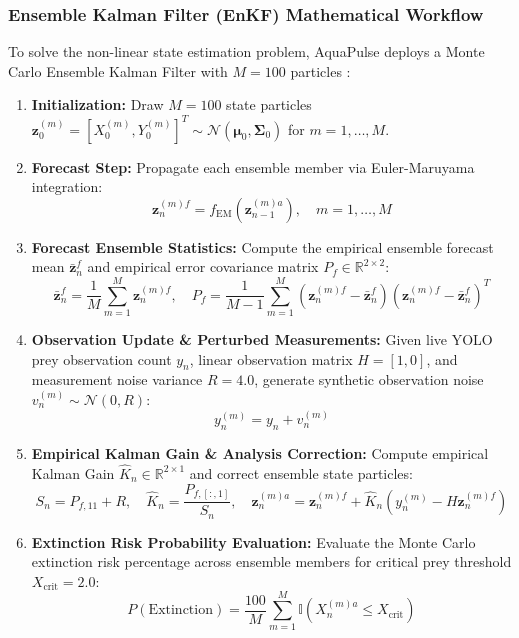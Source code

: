 \documentclass[11pt,a4paper]{article}
\newcommand{\citeblue}[1]{\cite{#1}}
\begin{document}
\subsubsection{Ensemble Kalman Filter (EnKF) Mathematical Workflow}
To solve the non-linear state estimation problem, AquaPulse deploys a Monte Carlo Ensemble Kalman Filter with $M = 100$ particles \citeblue{sprungk2023, evensen2009data}:
\begin{enumerate}
    \item \textbf{Initialization:} Draw $M=100$ state particles $\mathbf{z}_0^{(m)} = [X_0^{(m)}, Y_0^{(m)}]^T \sim \mathcal{N}(\boldsymbol{\mu}_0, \boldsymbol{\Sigma}_0)$ for $m=1, \dots, M$.
    \item \textbf{Forecast Step:} Propagate each ensemble member via Euler-Maruyama integration:
    \begin{equation}
    \mathbf{z}_n^{(m) f} = f_{\text{EM}}(\mathbf{z}_{n-1}^{(m) a}), \quad m=1,\dots,M
    \end{equation}
    \item \textbf{Forecast Ensemble Statistics:} Compute the empirical ensemble forecast mean $\bar{\mathbf{z}}_n^f$ and empirical error covariance matrix $P_f \in \mathbb{R}^{2 \times 2}$:
    \begin{equation}
    \bar{\mathbf{z}}_n^f = \frac{1}{M} \sum_{m=1}^M \mathbf{z}_n^{(m) f}, \quad P_f = \frac{1}{M-1} \sum_{m=1}^M \left(\mathbf{z}_n^{(m) f} - \bar{\mathbf{z}}_n^f\right) \left(\mathbf{z}_n^{(m) f} - \bar{\mathbf{z}}_n^f\right)^T
    \end{equation}
    \item \textbf{Observation Update \& Perturbed Measurements:} Given live YOLO prey observation count $y_n$, linear observation matrix $H = [1, 0]$, and measurement noise variance $R = 4.0$, generate synthetic observation noise $v_n^{(m)} \sim \mathcal{N}(0, R)$:
    \begin{equation}
    y_n^{(m)} = y_n + v_n^{(m)}
    \end{equation}
    \item \textbf{Empirical Kalman Gain \& Analysis Correction:} Compute empirical Kalman Gain $\hat{K}_n \in \mathbb{R}^{2 \times 1}$ and correct ensemble state particles:
    \begin{equation}
    S_n = P_{f, 11} + R, \quad \hat{K}_n = \frac{P_{f, [:, 1]}}{S_n}, \quad \mathbf{z}_n^{(m) a} = \mathbf{z}_n^{(m) f} + \hat{K}_n \left(y_n^{(m)} - H \mathbf{z}_n^{(m) f}\right)
    \end{equation}
    \item \textbf{Extinction Risk Probability Evaluation:} Evaluate the Monte Carlo extinction risk percentage across ensemble members for critical prey threshold $X_{\text{crit}} = 2.0$:
    \begin{equation}
    P(\text{Extinction}) = \frac{100}{M} \sum_{m=1}^M \mathbb{I}\left(X_n^{(m) a} \le X_{\text{crit}}\right)
    \end{equation}
\end{enumerate}
\end{document}
